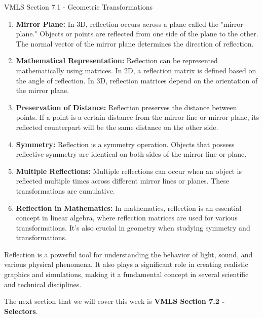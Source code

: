 \begin{notes}{VMLS Section 7.1 - Geometric Transformations}
\begin{enumerate}
        \item \textbf{Mirror Plane:} In 3D, reflection occurs across a plane called the "mirror plane." Objects or points are reflected from one side of the plane to the other. The normal vector of 
        the mirror plane determines the direction of reflection.
    
        \item \textbf{Mathematical Representation:} Reflection can be represented mathematically using matrices. In 2D, a reflection matrix is defined based on the angle of reflection. In 3D, reflection 
        matrices depend on the orientation of the mirror plane.
    
        \item \textbf{Preservation of Distance:} Reflection preserves the distance between points. If a point is a certain distance from the mirror line or mirror plane, its reflected counterpart will 
        be the same distance on the other side.
    
        \item \textbf{Symmetry:} Reflection is a symmetry operation. Objects that possess reflective symmetry are identical on both sides of the mirror line or plane.
    
        \item \textbf{Multiple Reflections:} Multiple reflections can occur when an object is reflected multiple times across different mirror lines or planes. These transformations are cumulative.
    
        \item \textbf{Reflection in Mathematics:} In mathematics, reflection is an essential concept in linear algebra, where reflection matrices are used for various transformations. It's also crucial 
        in geometry when studying symmetry and transformations.
    
    \end{enumerate}
    
    Reflection is a powerful tool for understanding the behavior of light, sound, and various physical phenomena. It also plays a significant role in creating realistic graphics and simulations, making 
    it a fundamental concept in several scientific and technical disciplines.
\end{notes}

The next section that we will cover this week is \textbf{VMLS Section 7.2 - Selectors}.

